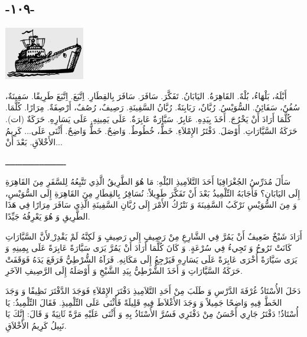 \documentclass[a5paper]{article}
\begin{document}
\subsection[-١٠٩-]{-١٠٩-}
\begin{center}
\includegraphics[width=1.3752in,height=0.9055in]{MuhammadBagauddinlatinized-img282.png}
\end{center}
أَبْلَهُ، بَلْهَاءُ، بُلْهٌ. القَاهِرَةُ. اليَابَانُ. تَفَكَّرَ. سَافَرَ. سَافَرَ بِالقِطَارِ. اِتَّبَعَ. اِتَّبَعَ طَرِيقًا. سَفِينَةٌ، سُفُنٌ، سَفَائِنُ. السُّوَيْسُ. رُبَّانٌ، رَبَابِنَةٌ. رُبَّانُ السَّفِينَةِ. رَصِيفٌ، رُصُفٌ، أَرْصِفَةٌ. مِرَارًا. كُلَّمَا. كُلَّمَا أَرَادَ أَنْ يَخْرُجَ. أَخَذَ بِيَدِهِ. عَابِرٌ. سَيَّارَةٌ عَابِرَةٌ. عَلَى يَمِينِهِ. عَلَى يَسَارِهِ. حَرَكَةٌ (ات). حَرَكَةُ السَّيَّارَاتِ. أَوْصَلَ. دَفْتَرُ الإِمْلاَءِ. خَطٌّ، خُطُوطٌ. وَاضِحٌ. خَطٌّ وَاضِحٌ. أَثْنَى عَلَى... كَرِيمُ الأَخْلاَقِ. بَعْدَ أَنْ...

ـــــــــــــــــــــــــ

سَأَلَ مُدَرِّسُ الجُغْرَافِيَا أَحَدَ التَّلاَمِيذِ البُلْهِ: مَا هُوَ الطَّرِيقُ الَّذِي تَتَّبِعُهُ لِلسَّفَرِ مِنَ القَاهِرَةِ إِلَى اليَابَانِ؟ فَأَجَابَهُ التِّلْمِيذُ بَعْدَ أَنْ تَفَكَّرَ طَوِيلاً: نُسَافِرُ بِالقِطَارِ مِنَ القَاهِرَةِ إِلَى السُّوَيْسِ، وَ مِنَ السُّوَيْسِ نَرْكَبُ السَّفِينَةَ وَ نَتْرُكُ الأَمْرَ إِلَى رُبَّانِ السَّفِينَةِ الَّذِي سَافَرَ مِرَارًا فِي هَذَا الطَّرِيقِ وَ هُوَ يَعْرِفُهُ جَيِّدًا.

أَرَادَ شَيْخٌ ضَعِيفٌ أَنْ يَمُرَّ فِي الشَّارِعِ مِنْ رَصِيفٍ إِلَى رَصِيفٍ وَ لَكِنَّهُ لَمْ يَقْدِرْ ِلأَنَّ السَّيَّارَاتِ كَانَتْ تَرُوحُ وَ تَجِيءُ فِي سُرْعَةٍ. وَ كَانَ كُلَّمَا أَرَادَ أَنْ يَمُرَّ يَرَى سَيَّارَةً عَابِرَةً عَلَى يِمِينِهِ وَ يَرَى سَيَّارَةً أُخْرَى عَابِرَةً عَلَى يَسَارِهِ فَيَرْجِعُ إِلَى مَكَانِهِ. فَرَآهُ الشُّرْطِيُّ فَرَفَعَ يَدَهُ فَوَقَفَتْ حَرَكَةُ السَّيَّارَاتِ وَ أَخَذَ الشُّرْطِيُّ بِيَدِ الشَّيْخِ وَ أَوْصَلَهُ إِلَى الرَّصِيفِ الآخَرِ.

دَخَلَ الأُسْتَاذُ غُرْفَةَ الدَّرْسِ وَ طَلَبَ مِنْ أَحَدِ التَّلاَمِيذِ دَفْتَرَ الإِمْلاَءِ فَوَجَدَ الدَّفْتَرَ نَظِيفًا وَ وَجَدَ الخَطَّ فِيهِ وَاضِحًا جَمِيلاً وَ وَجَدَ الأَغْلاَطَ فِيهِ قَلِيلَةً فَأَثْنَى عَلَى التِّلْمِيذِ. فَقَالَ التِّلْمِيذُ: يَا أُسْتَاذُ! دَفْتَرُ جَارِي أَحْسَنُ مِنْ دَفْتَرِي فَسُرَّ الأُسْتَاذُ بِهِ وَ أَثْنَى عَلَيْهِ مَرَّةً ثَانِيَةً وَ قَالَ: إِنَّكَ يَا نَبِيلُ كَرِيمُ الأَخْلاَقِ.
\end{document}
